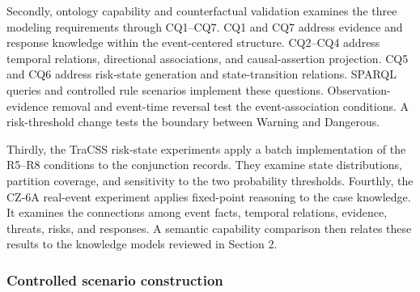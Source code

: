 \documentclass[Royal,sageh,times]{sagej}
\begin{document}
Secondly, ontology capability and counterfactual validation examines the three modeling requirements through CQ1--CQ7. CQ1 and CQ7 address evidence and response knowledge within the event-centered structure. CQ2--CQ4 address temporal relations, directional associations, and causal-assertion projection. CQ5 and CQ6 address risk-state generation and state-transition relations. SPARQL queries and controlled rule scenarios implement these questions. Observation-evidence removal and event-time reversal test the event-association conditions. A risk-threshold change tests the boundary between Warning and Dangerous.

Thirdly, the TraCSS risk-state experiments apply a batch implementation of the R5--R8 conditions to the conjunction records. They examine state distributions, partition coverage, and sensitivity to the two probability thresholds. Fourthly, the CZ-6A real-event experiment applies fixed-point reasoning to the case knowledge. It examines the connections among event facts, temporal relations, evidence, threats, risks, and responses. A semantic capability comparison then relates these results to the knowledge models reviewed in Section 2.

\subsubsection{Controlled scenario construction}
\end{document}

